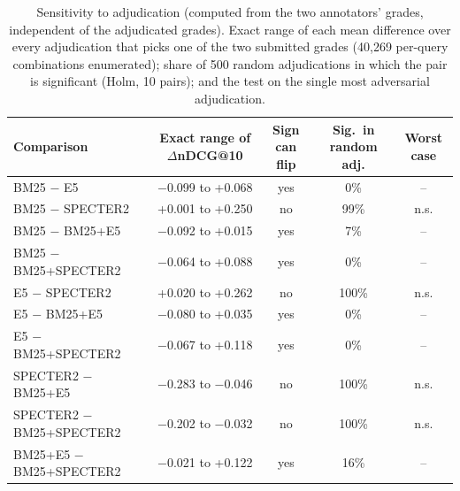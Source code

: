 \begin{table}[t]
\centering
\small
\caption{Sensitivity to adjudication (computed from the two annotators' grades, independent of the adjudicated grades). Exact range of each mean difference over every adjudication that picks one of the two submitted grades (40,269 per-query combinations enumerated); share of 500 random adjudications in which the pair is significant (Holm, 10 pairs); and the test on the single most adversarial adjudication.}
\label{tab:fsens}
\begin{tabular}{lcccc}
\toprule
Comparison & Exact range of $\Delta$nDCG@10 & Sign can flip & Sig.\ in random adj. & Worst case \\
\midrule
BM25 $-$ E5 & $-$0.099 to +0.068 & yes & 0\% & -- \\
BM25 $-$ SPECTER2 & +0.001 to +0.250 & no & 99\% & n.s. \\
BM25 $-$ BM25+E5 & $-$0.092 to +0.015 & yes & 7\% & -- \\
BM25 $-$ BM25+SPECTER2 & $-$0.064 to +0.088 & yes & 0\% & -- \\
E5 $-$ SPECTER2 & +0.020 to +0.262 & no & 100\% & n.s. \\
E5 $-$ BM25+E5 & $-$0.080 to +0.035 & yes & 0\% & -- \\
E5 $-$ BM25+SPECTER2 & $-$0.067 to +0.118 & yes & 0\% & -- \\
SPECTER2 $-$ BM25+E5 & $-$0.283 to $-$0.046 & no & 100\% & n.s. \\
SPECTER2 $-$ BM25+SPECTER2 & $-$0.202 to $-$0.032 & no & 100\% & n.s. \\
BM25+E5 $-$ BM25+SPECTER2 & $-$0.021 to +0.122 & yes & 16\% & -- \\
\bottomrule
\end{tabular}
\end{table}
